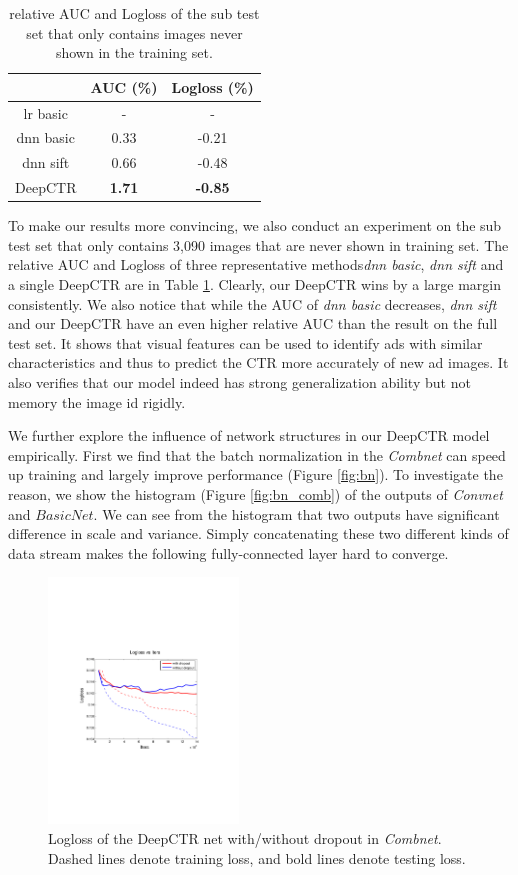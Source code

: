 \documentclass{sig-alternate}
\begin{document}
\begin{table}
	\centering
	\caption{relative AUC and Logloss of the sub test set that only contains images never shown in the training set.}
	\label{table:subset}
	\begin{tabular}{|c|c|c|} \hline
		 & AUC (\%) & Logloss (\%)\\ \hline
		lr basic & - & - \\ \hline
		dnn basic & 0.33 & -0.21 \\ \hline
		dnn sift & 0.66 & -0.48  \\ \hline
		DeepCTR & \textbf{1.71} & \textbf{-0.85} \\ \hline
	\end{tabular}
\end{table}
To make our results more convincing, we also conduct an experiment on the sub test set that only contains 3,090 images that are never shown in training set. The relative AUC and Logloss of three representative methods\emph{dnn basic}, \emph{dnn sift} and a single DeepCTR are in Table \ref{table:subset}. Clearly, our DeepCTR wins by a large margin consistently. We also notice that while the AUC of \emph{dnn basic} decreases, \emph{dnn sift} and our DeepCTR have an even higher relative AUC than the result on the full test set. It shows that visual features can be used to identify ads with similar characteristics and thus to predict the CTR more accurately of new ad images.   It also verifies that our model indeed has strong generalization ability but not  memory the image id rigidly.   

We further  explore the influence of network structures in our DeepCTR model empirically. First we find that the batch normalization in the \emph{Combnet} can speed up training and largely improve performance (Figure \ref{fig:bn}). To investigate the reason, we show the histogram (Figure \ref{fig:bn_comb}) of the outputs of \emph{Convnet} and $BasicNet$. We can see from the histogram  that two outputs have significant difference in scale and variance. Simply concatenating  these two different kinds of data stream  makes the following fully-connected layer hard to converge. 
\begin{figure}
	\centering
	\includegraphics[width=0.45\textwidth]{dropout_test_train}
	\caption{Logloss of the DeepCTR net with/without dropout in \emph{Combnet}. Dashed lines denote training loss, and bold lines denote testing loss.}
	\label{fig:dropout}
\end{figure}
\end{document}
